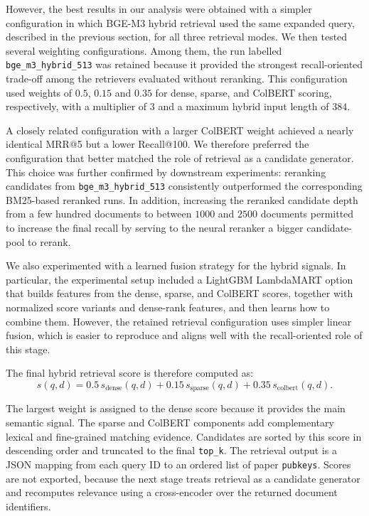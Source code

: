 However, the best results in our analysis were obtained with a simpler configuration in which BGE-M3 hybrid retrieval used the same expanded query, described in the previous section, for all three retrieval modes. We then tested several weighting configurations. Among them, the run labelled \texttt{bge\_m3\_hybrid\_513} was retained because it provided the strongest recall-oriented trade-off among the retrievers evaluated without reranking. This configuration used weights of $0.5$, $0.15$ and $0.35$ for dense, sparse, and ColBERT scoring, respectively, with a multiplier of $3$ and a maximum hybrid input length of $384$.

A closely related configuration with a larger ColBERT weight achieved a nearly identical MRR@5 but a lower Recall@100. We therefore preferred the configuration that better matched the role of retrieval as a candidate generator. This choice was further confirmed by downstream experiments: reranking candidates from \texttt{bge\_m3\_hybrid\_513} consistently outperformed the corresponding BM25-based reranked runs. In addition, increasing the reranked candidate depth from a few hundred documents to between $1000$ and $2500$ documents permitted to increase the final recall by serving to the neural reranker a bigger candidate-pool to rerank.

We also experimented with a learned fusion strategy for the hybrid signals. In particular, the experimental setup included a LightGBM LambdaMART option that builds features from the dense, sparse, and ColBERT scores, together with normalized score variants and dense-rank features, and then learns how to combine them. However, the retained retrieval configuration uses simpler linear fusion, which is easier to reproduce and aligns well with the recall-oriented role of this stage.

The final hybrid retrieval score is therefore computed as:
\[
s(q, d) =
0.5\,s_{\text{dense}}(q, d)
+ 0.15\,s_{\text{sparse}}(q, d)
+ 0.35\,s_{\text{colbert}}(q, d).
\]

The largest weight is assigned to the dense score because it provides the main semantic signal. The sparse and ColBERT components add complementary lexical and fine-grained matching evidence. Candidates are sorted by this score in descending order and truncated to the final \texttt{top\_k}. The retrieval output is a JSON mapping from each query ID to an ordered list of paper \texttt{pubkeys}. Scores are not exported, because the next stage treats retrieval as a candidate generator and recomputes relevance using a cross-encoder over the returned document identifiers.


